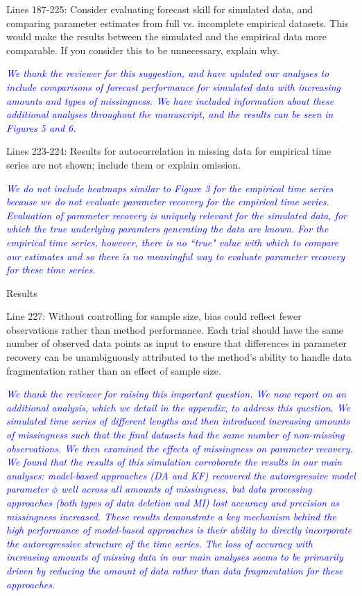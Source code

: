 \documentclass{article}
\begin{document}
\begin{linenumbers}
Lines 187-225: Consider evaluating forecast skill for simulated data, and comparing parameter estimates from full vs. incomplete empirical datasets. This would make the results between the simulated and the empirical data more comparable. If you consider this to be unnecessary, explain why.

\noindent \textcolor{blue}{\textit{We thank the reviewer for this suggestion, and have updated our analyses to include comparisons of forecast performance for simulated data with increasing amounts and types of missingness. We have included information about these additional analyses throughout the manuscript, and the results can be seen in Figures 5 and 6.}} 

Lines 223-224: Results for autocorrelation in missing data for empirical time series are not shown; include them or explain omission.

\noindent \textcolor{blue}{\textit{We do not include heatmaps similar to Figure 3 for the empirical time series because we do not evaluate parameter recovery for the empirical time series. Evaluation of parameter recovery is uniquely relevant for the simulated data, for which the true underlying paramters generating the data are known. For the empirical time series, however, there is no ``true" value with which to compare our estimates and so there is no meaningful way to evaluate parameter recovery for these time series.}}

Results

Line 227: Without controlling for sample size, bias could reflect fewer observations rather than method performance. Each trial should have the same number of observed data points as input to ensure that differences in parameter recovery can be unambiguously attributed to the method’s ability to handle data fragmentation rather than an effect of sample size.

\noindent \textcolor{blue}{\textit{We thank the reviewer for raising this important question. We now report on an additional analysis, which we detail in the appendix, to address this question. We simulated time series of different lengths and then introduced increasing amounts of missingness such that the final datasets had the same number of non-missing observations. We then examined the effects of missingness on parameter recovery. We found that the results of this simulation corroborate the results in our main analyses: model-based approaches (DA and KF) recovered the autoregressive model parameter $\phi$ well across all amounts of missingness, but data processing approaches (both types of data deletion and MI) lost accuracy and precision as missingness increased. These results demonstrate a key mechanism behind the high performance of model-based approaches is their ability to directly incorporate the autoregressive structure of the time series. The loss of accuracy with increasing amounts of missing data in our main analyses seems to be primarily driven by reducing the amount of data rather than data fragmentation for these approaches.}}


\end{linenumbers}
\end{document}
